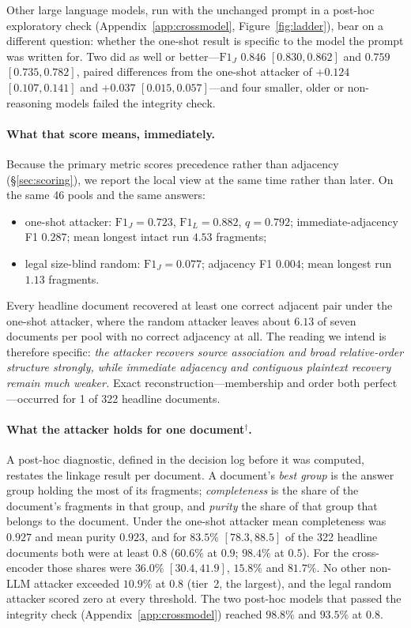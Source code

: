 \documentclass[sigconf,review]{acmart}
\newcommand{\FJ}{\ensuremath{\mathrm{F1}_{J}}}
\newcommand{\FL}{\ensuremath{\mathrm{F1}_{L}}}
\newcommand{\posthoc}{\ensuremath{^{\dagger}}}
\begin{document}
Other large language models, run with the unchanged prompt in a post-hoc
exploratory check (Appendix~\ref{app:crossmodel}, Figure~\ref{fig:ladder}),
bear on a different
question: whether the one-shot result is specific to the model the prompt was
written for. Two did as well or better---\FJ{} $0.846$ $[0.830, 0.862]$ and
$0.759$ $[0.735, 0.782]$, paired differences from the one-shot attacker of
$+0.124$ $[0.107, 0.141]$ and $+0.037$ $[0.015, 0.057]$---and four smaller,
older or non-reasoning models failed the integrity check.

\paragraph{What that score means, immediately.}
Because the primary metric scores precedence rather than adjacency
(\S\ref{sec:scoring}), we report the local view at the same time rather than
later. On the same 46 pools and the same answers:

\begin{itemize}
\item one-shot attacker: $\FJ = 0.723$, $\FL = 0.882$, $q = 0.792$;
      immediate-adjacency F1 $0.287$; mean longest intact run $4.53$ fragments;
\item legal size-blind random: $\FJ = 0.077$; adjacency F1 $0.004$; mean
      longest run $1.13$ fragments.
\end{itemize}

Every headline document recovered at least one correct adjacent pair under the
one-shot attacker, where the random attacker leaves about $6.13$ of seven
documents per pool with no correct adjacency at all. The reading we intend is
therefore specific: \emph{the attacker recovers source association and broad
relative-order structure strongly, while immediate adjacency and contiguous
plaintext recovery remain much weaker.} Exact reconstruction---membership and
order both perfect---occurred for 1 of 322 headline documents.

\paragraph{What the attacker holds for one document\posthoc.}
A post-hoc diagnostic, defined in the decision log before it was computed,
restates the linkage result per document. A document's \emph{best group} is
the answer group holding the most of its fragments; \emph{completeness} is the
share of the document's fragments in that group, and \emph{purity} the share
of that group that belongs to the document. Under the one-shot attacker mean
completeness was $0.927$ and mean purity $0.923$, and for $83.5\%$
$[78.3, 88.5]$ of the 322 headline documents both were at least $0.8$
($60.6\%$ at $0.9$; $98.4\%$ at $0.5$). For the cross-encoder those shares
were $36.0\%$ $[30.4, 41.9]$, $15.8\%$ and $81.7\%$. No other non-LLM attacker
exceeded $10.9\%$ at $0.8$ (tier~2, the largest), and the legal random attacker scored zero at every
threshold. The two post-hoc models that passed the integrity check
(Appendix~\ref{app:crossmodel}) reached $98.8\%$ and $93.5\%$ at $0.8$.
\end{document}
